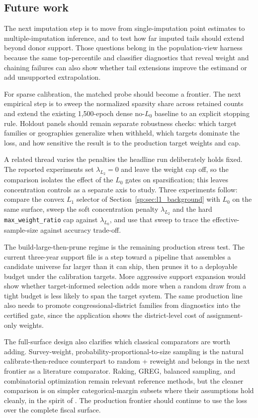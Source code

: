 \subsection{Future work}
\label{sp:sec:future_work}

The next imputation step is to move from single-imputation point
estimates to multiple-imputation inference, and to test how far
imputed tails should extend beyond donor support. Those questions
belong in the population-view harness because the same top-percentile
and classifier diagnostics that reveal weight and chaining failures
can also show whether tail extensions improve the estimand or add
unsupported extrapolation.

For sparse calibration, the matched probe should become a frontier.
The next empirical step is to sweep the normalized sparsity share
across retained counts and extend the existing 1{,}500-epoch dense
no-$L_0$ baseline to an explicit stopping rule. Holdout panels should remain separate
robustness checks: which target families or geographies generalize
when withheld, which targets dominate the loss, and how sensitive the
result is to the production target weights and cap.

A related thread varies the penalties the headline run deliberately
holds fixed. The reported experiments set $\lambda_{L_2}=0$ and leave
the weight cap off, so the comparison isolates the effect of the
$L_0$ gates on sparsification; this leaves concentration controls as
a separate axis to study. Three experiments follow: compare the
convex $L_1$ selector of Section~\ref{sp:sec:l1_background} with
$L_0$ on the same surface, sweep the soft concentration penalty
$\lambda_{L_2}$ and the hard \texttt{max\_weight\_ratio} cap against
$\lambda_{L_0}$, and use that sweep to trace the
effective-sample-size against accuracy trade-off.

The build-large-then-prune regime is the remaining production stress
test. The current three-year support file is a step toward a pipeline
that assembles a candidate universe far larger than it can ship, then
prunes it to a deployable budget under the calibration targets. More
aggressive support expansion would show whether target-informed
selection adds more when a random draw from a tight budget is less
likely to span the target system. The same production line also needs
to promote congressional-district families from diagnostics into the
certified gate, since the application shows the district-level cost of
assignment-only weights.

The full-surface design also clarifies which classical comparators are
worth adding. Survey-weight, probability-proportional-to-size sampling
is the natural calibrate-then-reduce counterpart to random + reweight
and belongs in the next frontier as a literature comparator. Raking,
GREG, balanced sampling, and combinatorial optimization remain
relevant reference methods, but the cleaner comparison is on simpler
categorical-margin subsets where their assumptions hold cleanly, in
the spirit of \citet{tanton2014co}. The
production frontier should continue to use the \populace{} loss over
the complete fiscal surface.
